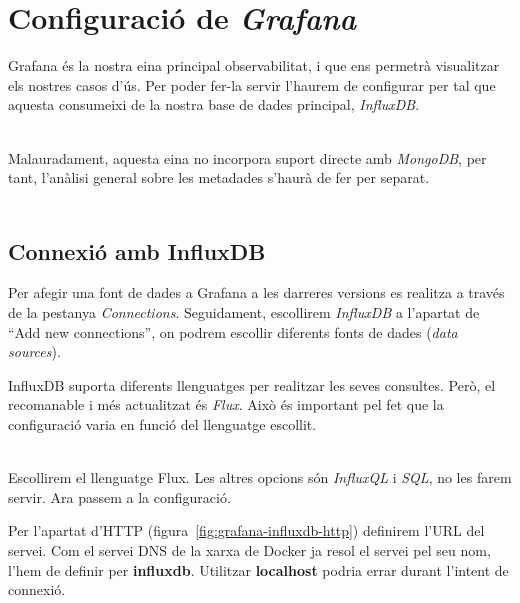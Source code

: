 \chapter{Configuració de \textit{Grafana}}\label{ch:grafana-config}

Grafana és la nostra eina principal observabilitat, i que ens permetrà visualitzar els nostres casos d'ús.
Per poder fer-la servir l'haurem de configurar per tal que aquesta consumeixi de la nostra base de dades principal, \textit{InfluxDB}.

\noindent \\
Malauradament, aquesta eina no incorpora suport directe amb \textit{MongoDB}, per tant, l'anàlisi general sobre les metadades s'haurà de fer per separat. \\ \\

\section*{Connexió amb InfluxDB}\label{sec:influxdb-grafana-connection}

\noindent
Per afegir una font de dades a Grafana a les darreres versions es realitza a través de la pestanya \textit{Connections}.
Seguidament,  escollirem \textit{InfluxDB} a l'apartat de ``Add new connections'', on podrem escollir diferents fonts de dades (\textit{data sources}). \\

\noindent
\begin{tcolorbox}[colback=blue!5!white, colframe=blue!75!black, title=Llenguatge de cerca]
    InfluxDB suporta diferents llenguatges per realitzar les seves consultes.
    Però, el recomanable i més actualitzat és \textit{Flux}.
    Això és important pel fet que la configuració varia en funció del llenguatge escollit.
\end{tcolorbox}

\noindent \\
Escollirem el llenguatge Flux.
Les altres opcions són \textit{InfluxQL} i \textit{SQL}, no les farem servir.
Ara passem a la configuració.

\clearpage

\noindent
Per l'apartat d'HTTP (figura~\ref{fig:grafana-influxdb-http}) definirem l'\gls{URL} del servei.
Com el servei \gls{DNS} de la xarxa de \gls{Docker} ja resol el servei pel seu nom, l'hem de definir per \textbf{influxdb}.
Utilitzar \textbf{localhost} podria errar durant l'intent de connexió.

